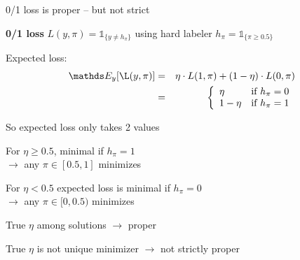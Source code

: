 \documentclass[11pt,compress,t,notes=noshow, xcolor=table]{beamer}
\begin{document}
\begin{framei}[sep=M]{0/1 loss is proper -- but not strict}

\item \textbf{0/1 loss} $L(y, \pi)=\mathds{1}_{\{y \neq h_\pi\}}$ using hard labeler  $h_{\pi}=\mathds{1}_{\{\pi\geq0.5\}}$ 
\item Expected loss:
\begin{eqnarray*}
\E_y[\L(y, \pi)] &=& \eta \cdot L(1,\pi) + (1-\eta) \cdot L(0,\pi)\\
&=& \left\{
\begin{array}{ll}
\eta & \text{if } h_{\pi} = 0 \\
1-\eta & \text{if } h_{\pi} = 1
\end{array}
\right.
\end{eqnarray*}

\item So expected loss only takes 2 values

\item For $\eta \geq 0.5$, minimal if $h_{\pi}=1$\\ $\rightarrow$ any $\pi \in [0.5,1]$ minimizes 

\item For $\eta < 0.5$ expected loss is minimal if $h_{\pi}=0$\\ $\rightarrow$ any $\pi \in [0, 0.5)$ minimizes 

\item True $\eta$ among solutions $\rightarrow$ proper
\item True $\eta$ is not unique minimizer $\rightarrow$ not strictly proper


\end{framei}
\end{document}

